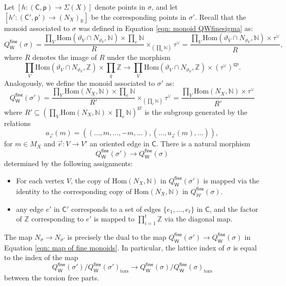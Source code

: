 \documentclass{article}
\def\N{{\mathbb{N}}}
\newcommand{\gr}{\mathrm{gr}}
\newcommand{\tors}{\mathrm{tors}}
\newcommand{\fine}{\mathsf{fine}}
\newcommand{\W}{\mathsf{W}}
\begin{document}
Let $[h:(\mathsf{C},\mathsf{p}) \to \Sigma(X)]$ denote points in $\sigma$, and let $[h':(\mathsf{C}',\mathsf{p}') \to (N_X)_{\mathbb{R}}]$ be the corresponding points in $\sigma'$. Recall that the monoid associated to $\sigma$ was defined in Equation \eqref{eqn: monoid QWfinesigma} as:
\[
Q_{\W}^{\mathsf{fine}}(\sigma) = \frac{\prod_V \mathrm{Hom}(\vartheta_V \cap N_{\vartheta_V}, \mathbb{N}) \times \prod_e \mathbb{N}}{R} \times_{(\prod_e \mathbb{N})} \tau^\vee = \frac{\prod_V \mathrm{Hom}(\vartheta_V \cap N_{\vartheta_V}, \mathbb{N}) \times \tau^\vee}{\overline{R}},
\]
where $\overline{R}$ denotes the image of $R$ under the morphism 
\begin{equation*} 
\prod_V \mathrm{Hom}(\vartheta_V \cap N_{\vartheta_V}, \mathbb{Z}) \times \prod_q \mathbb{Z} \to \prod_V \mathrm{Hom}(\vartheta_V \cap N_{\vartheta_V}, \mathbb{Z}) \times (\tau^\vee)^{\text{gp}}.
\end{equation*}
Analogously, we define the monoid associated to $\sigma'$ as:
\begin{equation}\label{eqn: monoid QWfinesigma'}
Q_{\W}^{\mathsf{fine}}(\sigma') = \frac{\prod_V \mathrm{Hom}(N_X, \mathbb{N}) \times \prod_e \mathbb{N}}{R'} \times_{(\prod_e \mathbb{N})} \tau^\vee = \frac{\prod_V \mathrm{Hom}(N_X, \mathbb{N}) \times \tau^\vee}{\overline{R'}}
\end{equation}
where $R' \subseteq \left(\prod_V \mathrm{Hom}(N_X, \mathbb{N}) \times \prod_e \mathbb{N}\right)^{\gr}$ is the subgroup generated by the relations
        $$
        a_{\vec{e}}(m) = \left((\ldots, m, \ldots, -m, \ldots), (\ldots, u_{\vec{e}}(m), \ldots)\right),
        $$
        for $m \in M_X$ and $\vec{e}: V \to V'$ an oriented edge in $\mathsf{C}$.
There is a natural morphism \begin{equation}\label{eqn: map of fine monoids}
    Q_{\W}^{\mathsf{fine}}(\sigma') \to Q_{\W}^{\mathsf{fine}}(\sigma)
\end{equation}
determined by the following assignments:
\begin{itemize}
    \item For each vertex $V$, the copy of $\mathrm{Hom}(N_X,\N)$ in $Q_{\W}^{\mathsf{fine}}(\sigma')$ is mapped via the identity to the corresponding copy of $\mathrm{Hom}(N_X,\N)$ in $Q_{\mathcal{W}}^{\mathsf{fine}}(\sigma)$.
    \item any edge $e'$ in $\mathsf{C}'$ corresponds to a set of edges $\{e_1, \ldots, e_t\}$ in $\mathsf{C}$, and the factor of $\mathbb{Z}$ corresponding to $e'$ is mapped to $\prod_{i=1}^t \mathbb{Z}$ via the diagonal map.
\end{itemize}
The map $N_\sigma \to N_{\sigma'}$ is precisely the dual to the map $Q_{\W}^{\mathsf{fine}}(\sigma') \to Q_{\W}^{\mathsf{fine}}(\sigma)$ in Equation \eqref{eqn: map of fine monoids}. In particular, the lattice index of $\sigma$ is equal to the index of the map
$$
Q_{\W}^{\mathsf{fine}}(\sigma') /Q_\W^{\fine}(\sigma')_{\tors} \to Q_{\W}^{\mathsf{fine}}(\sigma)/Q_\W^{\fine}(\sigma)_{\tors}
$$
between the torsion free parts.
\end{document}
